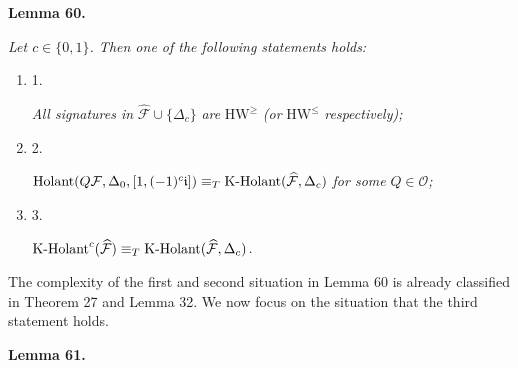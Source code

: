 \documentclass[10pt,a4paper]{article}
\begin{document}


\par\medskip\noindent\textbf{
\textbf{Lemma 60}\textbf{.}
}\par



\emph{Let $c\in\{0,1\}$. Then one of the following statements holds:}\par


\begin{enumerate}


\item[] 
1. 


\emph{All signatures in }$\widehat{\mathcal{F}}\cup\{\Delta_{c}\}$\emph{ are }$\text{HW}^{\geq}$\emph{ (or }$\text{HW}^{\leq}$\emph{ respectively);}\par





\item[] 
2. 


$\textup{{Holant}}(Q\mathcal{F},\Delta_{0},[1,(-1)^{c}\mathfrak{i}])\equiv_{T}\textup{{K-Holant}}(\widehat{\mathcal{F}},\Delta_{c})$\emph{ for some }$Q\in\mathscr{O}$\emph{;}\par





\item[] 
3. 


$\textup{{K-Holant}}^{c}(\widehat{\mathcal{F}})\equiv_{T}\textup{{K-Holant}}(\widehat{\mathcal{F}},\Delta_{c})$\emph{.}\par





\end{enumerate}






The complexity of the first and second situation in Lemma 60 is already classified in Theorem 27 and Lemma 32. We now focus on the situation that the third statement holds.\par





\par\medskip\noindent\textbf{
\textbf{Lemma 61}\textbf{.}
}\par
\end{document}
